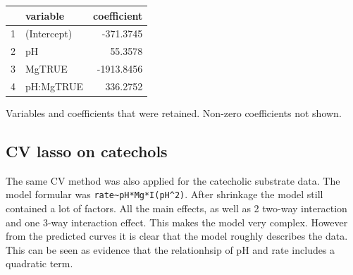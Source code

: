 \documentclass[]{tufte-handout}
\begin{document}
\begin{margintable}
\centering
\begin{tabular}{rlr}
  \toprule
 & variable & coefficient \\ 
  \midrule
1 & (Intercept) & -371.3745 \\ 
  2 & pH & 55.3578 \\ 
  3 & MgTRUE & -1913.8456 \\ 
  4 & pH:MgTRUE & 336.2752 \\ 
   \bottomrule
\end{tabular}
\caption{Variables and coefficients that were retained. Non-zero coefficients not shown.} 
\end{margintable}

\newpage

\subsection{CV lasso on catechols}\label{cv-lasso-on-catechols}

The same CV method was also applied for the catecholic substrate data.
The model formular was \texttt{rate\textasciitilde{}pH*Mg*I(pH\^{}2)}.
After shrinkage the model still contained a lot of factors. All the main
effects, as well as 2 two-way interaction and one 3-way interaction
effect. This makes the model very complex. However from the predicted
curves it is clear that the model roughly describes the data. This can
be seen as evidence that the relationhsip of pH and rate includes a
quadratic term.
\end{document}
